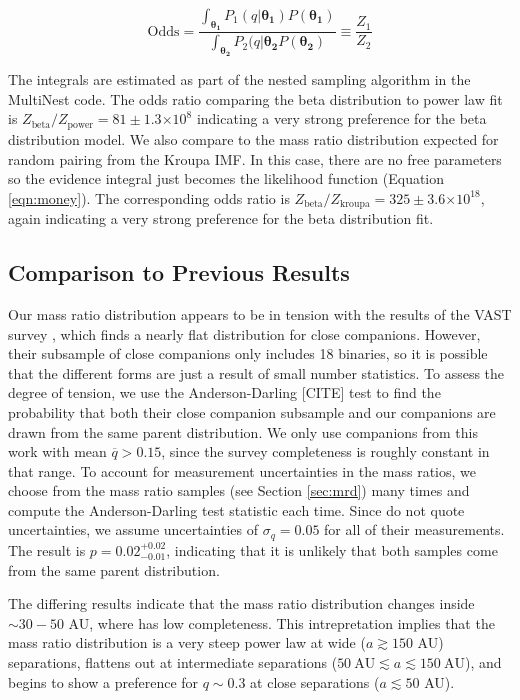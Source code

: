 \documentclass{emulateapj}
\providecommand{\e}[1]{\ensuremath{\times 10^{#1}}}
\renewcommand{\vec}[1]{\bm{#1}}
\begin{document}
\begin{equation}
\mathrm{Odds} = \frac{\int_{\vec{\theta_1}} P_1(q|\vec{\theta_1}) P(\vec{\theta_1})}{\int_{\vec{\theta_2}} P_2(q|\vec{\theta_2}  P(\vec{\theta_2})} \equiv \frac{Z_1}{Z_2}
\end{equation}

The integrals are estimated as part of the nested sampling algorithm in the MultiNest code. The odds ratio comparing the beta distribution to power law fit is $Z_\mathrm{beta} / Z_\mathrm{power} = 81 \pm 1.3 \e{8}$ indicating a very strong preference for the beta distribution model. We also compare to the mass ratio distribution expected for random pairing from the Kroupa IMF. In this case, there are no free parameters so the evidence integral just becomes the likelihood function (Equation \ref{eqn:money}). The corresponding odds ratio is  $Z_\mathrm{beta} / Z_\mathrm{kroupa} = 325 \pm 3.6 \e{18}$, again indicating a very strong preference for the beta distribution fit.


\subsection{Comparison to Previous Results}

Our mass ratio distribution appears to be in tension with the results of the VAST survey \citep{DeRosa2014}, which finds a nearly flat distribution for close companions. However, their subsample of close companions only includes 18 binaries, so it is possible that the different forms are just a result of small number statistics. To assess the degree of tension, we use the Anderson-Darling [CITE] test to find the probability that both their close companion subsample and our companions are drawn from the same parent distribution. We only use companions from this work with mean $\overline{q} > 0.15$, since the survey completeness is roughly constant in that range. To account for measurement uncertainties in the mass ratios, we choose from the mass ratio samples (see Section \ref{sec:mrd}) many times and compute the Anderson-Darling test statistic each time. Since \citet{DeRosa2014} do not quote uncertainties, we assume uncertainties of $\sigma_q = 0.05$ for all of their measurements. The result is $p = 0.02^{+0.02}_{-0.01}$, indicating that it is unlikely that both samples come from the same parent distribution.

The differing results indicate that the mass ratio distribution changes inside $\sim 30-50$ AU, where \citet{DeRosa2014} has low completeness. This intrepretation implies that the mass ratio distribution is a very steep power law at wide ($a \gtrsim 150$ AU) separations, flattens out at intermediate separations ($50\ \mathrm{AU} \lesssim a \lesssim 150\ \mathrm{AU}$), and begins to show a preference for $q \sim 0.3$ at close separations ($a \lesssim 50$ AU).
\end{document}

